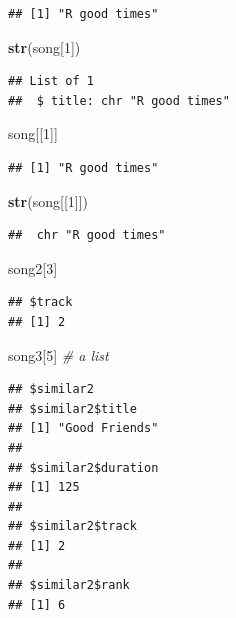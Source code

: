\documentclass[]{book}
\newenvironment{Shaded}{\begin{snugshade}}{\end{snugshade}}
\newcommand{\KeywordTok}[1]{\textcolor[rgb]{0.13,0.29,0.53}{\textbf{{#1}}}}
\newcommand{\DecValTok}[1]{\textcolor[rgb]{0.00,0.00,0.81}{{#1}}}
\newcommand{\CommentTok}[1]{\textcolor[rgb]{0.56,0.35,0.01}{\textit{{#1}}}}
\newcommand{\NormalTok}[1]{{#1}}
\begin{document}
\begin{verbatim}
## [1] "R good times"
\end{verbatim}

\begin{Shaded}
\begin{Highlighting}[]
\KeywordTok{str}\NormalTok{(song[}\DecValTok{1}\NormalTok{])}
\end{Highlighting}
\end{Shaded}

\begin{verbatim}
## List of 1
##  $ title: chr "R good times"
\end{verbatim}

\begin{Shaded}
\begin{Highlighting}[]
\NormalTok{song[[}\DecValTok{1}\NormalTok{]]}
\end{Highlighting}
\end{Shaded}

\begin{verbatim}
## [1] "R good times"
\end{verbatim}

\begin{Shaded}
\begin{Highlighting}[]
\KeywordTok{str}\NormalTok{(song[[}\DecValTok{1}\NormalTok{]])}
\end{Highlighting}
\end{Shaded}

\begin{verbatim}
##  chr "R good times"
\end{verbatim}

\begin{Shaded}
\begin{Highlighting}[]
\NormalTok{song2[}\DecValTok{3}\NormalTok{]}
\end{Highlighting}
\end{Shaded}

\begin{verbatim}
## $track
## [1] 2
\end{verbatim}

\begin{Shaded}
\begin{Highlighting}[]
\NormalTok{song3[}\DecValTok{5}\NormalTok{]  }\CommentTok{# a list}
\end{Highlighting}
\end{Shaded}

\begin{verbatim}
## $similar2
## $similar2$title
## [1] "Good Friends"
## 
## $similar2$duration
## [1] 125
## 
## $similar2$track
## [1] 2
## 
## $similar2$rank
## [1] 6
\end{verbatim}
\end{document}
